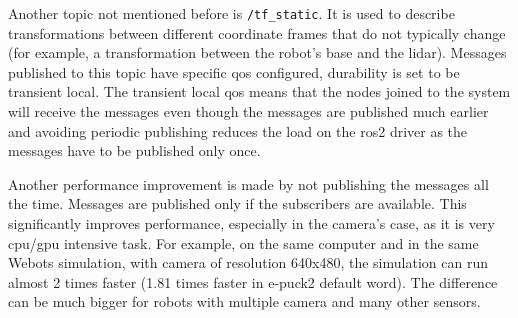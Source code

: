 Another topic not mentioned before is \texttt{/tf\_static}. 
It is used to describe transformations between different coordinate frames that do not typically change (for example, a transformation between the robot's base and the \ac{lidar}).
Messages published to this topic have specific \ac{qos} configured, durability is set to be transient local.
The transient local \ac{qos} means that the nodes joined to the system will receive the messages even though the messages are published much earlier and avoiding periodic publishing reduces the load on the \ac{ros2} driver as the messages have to be published only once.

Another performance improvement is made by not publishing the messages all the time. Messages are published only if the subscribers are available.
This significantly improves performance, especially in the camera's case, as it is very \acs{cpu}/\acs{gpu} intensive task.
For example, on the same computer and in the same Webots simulation, with camera of resolution 640x480, the simulation can run almost 2 times faster (1.81 times faster in e-puck2 default word).
The difference can be much bigger for robots with multiple camera and many other sensors.

